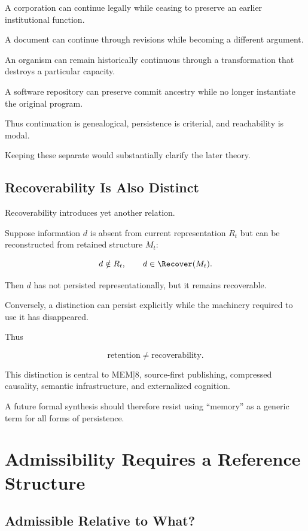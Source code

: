 \documentclass[11pt]{article}
\theoremstyle{remark}
\newcommand{\MEM}{\textsc{MEM|8}}
\begin{document}
A corporation can continue legally while ceasing to preserve an earlier institutional function.

A document can continue through revisions while becoming a different argument.

An organism can remain historically continuous through a transformation that destroys a particular capacity.

A software repository can preserve commit ancestry while no longer instantiate the original program.

Thus continuation is genealogical, persistence is criterial, and reachability is modal.

Keeping these separate would substantially clarify the later theory.

\subsection{Recoverability Is Also Distinct}

Recoverability introduces yet another relation.

Suppose information $d$ is absent from current representation $R_t$ but can be reconstructed from retained structure $M_t$:

\begin{equation}
d\notin R_t,
\qquad
d\in\Recover(M_t).
\end{equation}

Then $d$ has not persisted representationally, but it remains recoverable.

Conversely, a distinction can persist explicitly while the machinery required to use it has disappeared.

Thus

\begin{equation}
\text{retention}
\neq
\text{recoverability}.
\end{equation}

This distinction is central to \MEM{}, source-first publishing, compressed causality, semantic infrastructure, and externalized cognition.

A future formal synthesis should therefore resist using ``memory'' as a generic term for all forms of persistence.

\section{Admissibility Requires a Reference Structure}

\subsection{Admissible Relative to What?}
\end{document}

